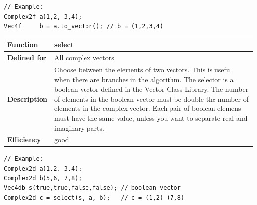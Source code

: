 \documentclass[11pt,a4paper,oneside,openright]{report}
\newcommand{\vspacesmall}{\vspace{3mm}}
\newcommand{\vspacebig}{\vspace{6mm}}
\begin{document}
\begin{lstlisting}[frame=none]
// Example:
Complex2f a(1,2, 3,4);
Vec4f     b = a.to_vector(); // b = (1,2,3,4)
\end{lstlisting}
\vspacebig


\begin{tabular}{|p{25mm}|p{100mm}|}
\hline
\bfseries Function & select \\ \hline
\bfseries Defined for & All complex vectors  \\ \hline
\bfseries Description & Choose between the elements of two vectors.
This is useful when there are branches in the algorithm.\newline
The selector is a boolean vector defined in the Vector Class Library.
The number of elements in the boolean vector must be double the number of elements in the complex vector. Each pair of boolean elemens must have the same value, unless you want to separate real and imaginary parts. \\ \hline
\bfseries Efficiency & good \\ \hline
\end{tabular}
\vspacesmall

\begin{lstlisting}[frame=none]
// Example:
Complex2d a(1,2, 3,4);
Complex2d b(5,6, 7,8);
Vec4db s(true,true,false,false); // boolean vector
Complex2d c = select(s, a, b);   // c = (1,2) (7,8)
\end{lstlisting}
\vspacebig
\end{document}
